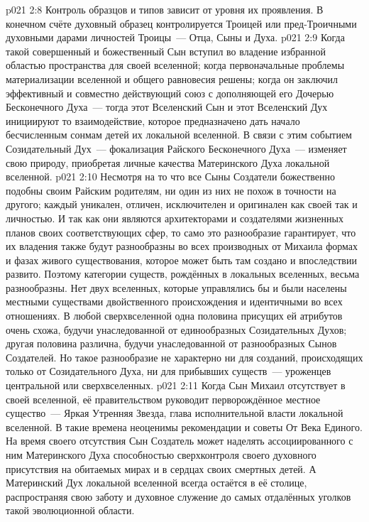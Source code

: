 \vs p021 2:8 \pc Контроль образцов и типов  зависит от уровня их проявления. В конечном счёте духовный образец контролируется Троицей или пред\hyp{}Троичными духовными дарами личностей Троицы~--- Отца, Сыны и Духа.
\vs p021 2:9 \pc Когда такой совершенный и божественный Сын вступил во владение избранной областью пространства для своей вселенной; когда первоначальные проблемы материализации вселенной и общего равновесия решены; когда он заключил эффективный и совместно действующий союз с дополняющей его Дочерью Бесконечного Духа~--- тогда этот Вселенский Сын и этот Вселенский Дух инициируют то взаимодействие, которое предназначено дать начало бесчисленным сонмам детей их локальной вселенной. В связи с этим событием Созидательный Дух~--- фокализация Райского Бесконечного Духа~--- изменяет свою природу, приобретая личные качества Материнского Духа локальной вселенной.
\vs p021 2:10 Несмотря на то что все Сыны Создатели божественно подобны своим Райским родителям, ни один из них не похож в точности на другого; каждый уникален, отличен, исключителен и оригинален как своей  так и личностью. И так как они являются архитекторами и создателями жизненных планов своих соответствующих сфер, то само это разнообразие гарантирует, что их владения также будут разнообразны во всех производных от Михаила формах и фазах живого существования, которое может быть там создано и впоследствии развито. Поэтому категории существ, рождённых в локальных вселенных, весьма разнообразны. Нет двух вселенных, которые управлялись бы и были населены местными существами двойственного происхождения и идентичными во всех отношениях. В любой сверхвселенной одна половина присущих ей атрибутов очень схожа, будучи унаследованной от единообразных Созидательных Духов; другая половина различна, будучи унаследованной от разнообразных Сынов Создателей. Но такое разнообразие не характерно ни для созданий, происходящих только от Созидательного Духа, ни для прибывших существ~--- уроженцев центральной или сверхвселенных.
\vs p021 2:11 \pc Когда Сын Михаил отсутствует в своей вселенной, её правительством руководит перворождённое местное существо~--- Яркая Утренняя Звезда, глава исполнительной власти локальной вселенной. В такие времена неоценимы рекомендации и советы От Века Единого. На время своего отсутствия Сын Создатель может наделять ассоциированного с ним Материнского Духа способностью сверхконтроля своего духовного присутствия на обитаемых мирах и в сердцах своих смертных детей. А Материнский Дух локальной вселенной всегда остаётся в её столице, распространяя свою заботу и духовное служение до самых отдалённых уголков такой эволюционной области.
